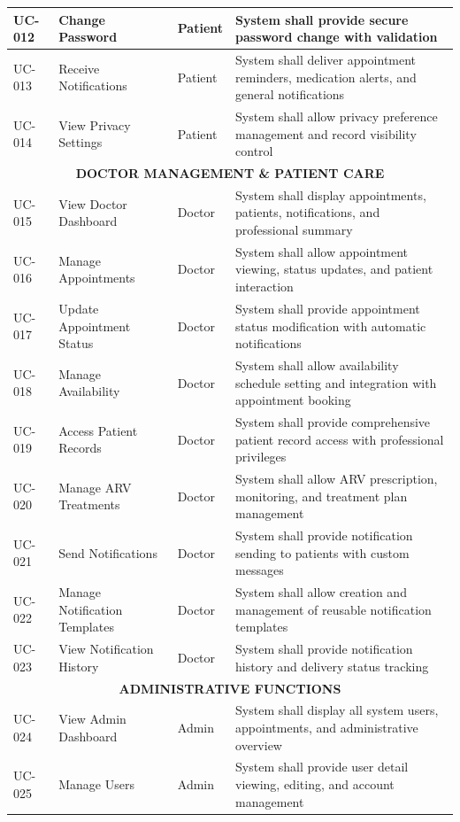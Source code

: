 \documentclass[12pt,a4paper]{article}
\begin{document}
\begin{longtable}{|p{1.2cm}|p{2.5cm}|p{3.5cm}|p{6.8cm}|}
\hline
UC-012 & Change Password & Patient & System shall provide secure password change with validation \\
\hline
UC-013 & Receive Notifications & Patient & System shall deliver appointment reminders, medication alerts, and general notifications \\
\hline
UC-014 & View Privacy Settings & Patient & System shall allow privacy preference management and record visibility control \\
\hline
\multicolumn{4}{|c|}{\textbf{DOCTOR MANAGEMENT \& PATIENT CARE}} \\
\hline
UC-015 & View Doctor Dashboard & Doctor & System shall display appointments, patients, notifications, and professional summary \\
\hline
UC-016 & Manage Appointments & Doctor & System shall allow appointment viewing, status updates, and patient interaction \\
\hline
UC-017 & Update Appointment Status & Doctor & System shall provide appointment status modification with automatic notifications \\
\hline
UC-018 & Manage Availability & Doctor & System shall allow availability schedule setting and integration with appointment booking \\
\hline
UC-019 & Access Patient Records & Doctor & System shall provide comprehensive patient record access with professional privileges \\
\hline
UC-020 & Manage ARV Treatments & Doctor & System shall allow ARV prescription, monitoring, and treatment plan management \\
\hline
UC-021 & Send Notifications & Doctor & System shall provide notification sending to patients with custom messages \\
\hline
UC-022 & Manage Notification Templates & Doctor & System shall allow creation and management of reusable notification templates \\
\hline
UC-023 & View Notification History & Doctor & System shall provide notification history and delivery status tracking \\
\hline
\multicolumn{4}{|c|}{\textbf{ADMINISTRATIVE FUNCTIONS}} \\
\hline
UC-024 & View Admin Dashboard & Admin & System shall display all system users, appointments, and administrative overview \\
\hline
UC-025 & Manage Users & Admin & System shall provide user detail viewing, editing, and account management \\

\end{longtable}
\end{document}
